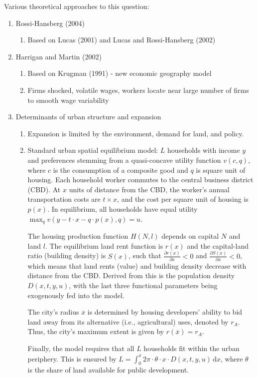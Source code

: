\documentclass[preprint,2p,12pt]{elsarticle}
\begin{document}
Various theoretical approaches to this question:
\begin{enumerate}
\item Rossi-Hansberg (2004)
  \begin{enumerate}
  \item Based on Lucas (2001) and Lucas and Rossi-Hansberg (2002)
  \end{enumerate}
\item Harrigan and Martin (2002)
  \begin{enumerate}
  \item Based on Krugman (1991) - new economic geography model
  \item Firms shocked, volatile wages, workers locate near large number of firms to smooth wage variability 
  \end{enumerate}
\item Determinants of urban structure and expansion
  \begin{enumerate}
  \item Expansion is limited by the environment, demand for land, and policy.
  \item Standard urban spatial equilibrium model: $L$ households with income $y$ and preferences stemming from a quasi-concave utility function $v(c,q)$, where $c$ is the consumption of a composite good and $q$ is square unit of housing. Each household worker commutes to the central business district (CBD). At $x$ units of distance from the CBD, the worker's annual transportation costs are $t \times x$, and the cost per square unit of housing is $p(x)$. In equilibrium, all households have equal utility $\max_{q} v(y - t \cdot x - q \cdot p(x), q) = u$. 
  
  The housing production function $H(N, l)$ depends on capital $N$ and land $l$. The equilibrium land rent function is $r(x)$ and the capital-land ratio (building density) is $S(x)$, such that $\frac{\partial r(x)}{\partial x} < 0$ and $\frac{\partial S(x)}{\partial x} < 0$, which means that land rents (value) and building density decrease with distance from the CBD. Derived from this is the population density $D(x,t,y,u)$, with the last three functional parameters being exogenously fed into the model.

  The city's radius $\overline{x}$ is determined by housing developers' ability to bid land away from its alternative (i.e., agricultural) uses, denoted by $r_A$. Thus, the city's maximum extent is given by $r(\overline{x}) = r_A$.

  Finally, the model requires that all $L$ households fit within the urban periphery. This is ensured by $L = \int_{0}^{\overline{x}} \! 2 \pi \cdot \theta \cdot x \cdot D(x,t,y,u) \, \mathrm{d}x$, where $\theta$ is the share of land available for public development.
  \end{enumerate}


\end{enumerate}
\end{document}
